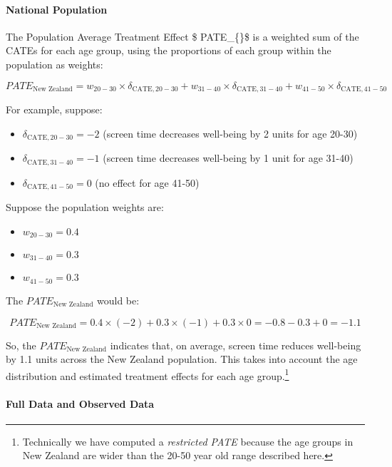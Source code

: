 \documentclass[
  singlecolumn]{article}
\let\oldparagraph\paragraph
\renewcommand{\paragraph}[1]{\oldparagraph{#1}\mbox{}}
\providecommand{\tightlist}{%
  \setlength{\itemsep}{0pt}\setlength{\parskip}{0pt}}\usepackage{longtable,booktabs,array}
\begin{document}
\paragraph{National Population}\label{national-population}

The Population Average Treatment Effect \$
PATE\_\{\}\$ is a weighted sum of the CATEs for each
age group, using the proportions of each group within the population as
weights:

\[
PATE_{\text{New Zealand}} = w_{20-30} \times \delta_{\text{CATE}, 20-30} + w_{31-40} \times \delta_{\text{CATE}, 31-40} + w_{41-50} \times \delta_{\text{CATE}, 41-50}
\]

For example, suppose:

\begin{itemize}
\tightlist
\item
  \(\delta_{\text{CATE}, 20-30} = -2\) (screen time decreases well-being
  by 2 units for age 20-30)
\item
  \(\delta_{\text{CATE}, 31-40} = -1\) (screen time decreases well-being
  by 1 unit for age 31-40)
\item
  \(\delta_{\text{CATE}, 41-50} = 0\) (no effect for age 41-50)
\end{itemize}

Suppose the population weights are:

\begin{itemize}
\tightlist
\item
  \(w_{20-30} = 0.4\)
\item
  \(w_{31-40} = 0.3\)
\item
  \(w_{41-50} = 0.3\)
\end{itemize}

The \(PATE_{\text{New Zealand}}\) would be:

\[
PATE_{\text{New Zealand}} = 0.4 \times (-2) + 0.3 \times (-1) + 0.3 \times 0 = -0.8 - 0.3 + 0 = -1.1
\]

So, the \(PATE_{\text{New Zealand}}\) indicates that, on average, screen
time reduces well-being by 1.1 units across the New Zealand population.
This takes into account the age distribution and estimated treatment
effects for each age group.\footnote{Technically we have computed a
  \emph{restricted PATE} because the age groups in New Zealand are wider
  than the 20-50 year old range described here.}

\paragraph{\texorpdfstring{\textbf{Full Data and Observed
Data}}{Full Data and Observed Data}}\label{full-data-and-observed-data}
\end{document}
